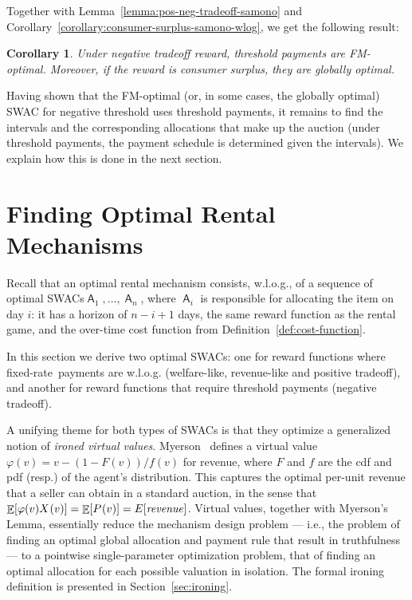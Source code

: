 \documentclass[11pt,letterpaper]{article}
\newcommand{\fr}{fixed-rate\xspace}
\newcommand{\swac}{SWAC\xspace}
\newcommand{\swacs}{SWACs\xspace}
\DeclareMathOperator*{\E}{\bb{E}}
\newcommand{\bb}[1]{\mathbb{#1}}
\DeclareMathOperator{\A}{\auc{A}}
\theoremstyle{plain}
\newtheorem{corollary}[theorem]{Corollary}
\newcommand{\auc}[1]{\mathsf{#1}}
\begin{document}
Together with Lemma~\ref{lemma:pos-neg-tradeoff-samono} and Corollary~\ref{corollary:consumer-surplus-samono-wlog}, we get the following result:

\begin{corollary}
\label{cor:neg-tradeoff-threshold-payment}
Under negative tradeoff reward, threshold payments are FM-optimal.
Moreover, if the reward is consumer surplus, they are globally optimal.
\end{corollary}




Having shown that the FM-optimal (or, in some cases, the globally optimal) \swac for negative threshold uses threshold payments,
it remains to find the intervals
and the corresponding allocations that make up the auction (under threshold payments, the payment schedule is determined given the intervals).
We explain how this is done in the next section.

\section{Finding Optimal Rental Mechanisms}\label{sec:tech-overview-rental-mechs}

Recall that an optimal rental mechanism consists, w.l.o.g., of a sequence of optimal \swacs $\A_1,\ldots,\A_n$,
where $\A_i$ is responsible for allocating the item on day $i$:
it has a horizon of $n - i+1$ days,
the same reward function as the rental game,
and the over-time cost function from Definition~\ref{def:cost-function}.

In this section we derive two optimal \swacs: one for reward functions where \fr\ payments are w.l.o.g. (welfare-like, revenue-like and positive tradeoff),
and another for reward functions that require threshold payments (negative tradeoff). 

A unifying theme for both types of \swacs is that they optimize a generalized notion of \emph{ironed virtual values}.
Myerson~\cite{myerson1981optimal} defines a virtual value $\varphi(v)=v-(1-F(v))/f(v)$ for revenue, where $F$ and $f$ are the cdf and pdf (resp.) of the agent's distribution.
This captures the optimal per-unit revenue that a seller can obtain
in a standard auction,
in the sense that
$\E[\varphi(v)\x{v}]=\E[\p{v}]=E[\mathit{revenue}]$.
Virtual values, together with Myerson's Lemma, essentially reduce the mechanism design problem --- i.e., the problem of finding an optimal global allocation and payment rule that result in truthfulness --- to a pointwise single-parameter optimization problem,
that of finding an optimal allocation for each possible valuation in isolation. The formal ironing definition is presented in Section~\ref{sec:ironing}.
\end{document}
